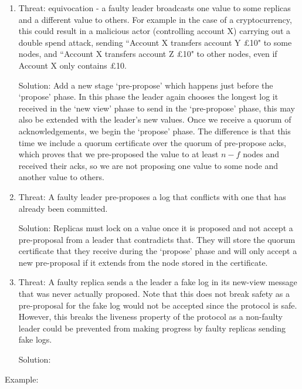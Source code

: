 \documentclass[a4paper]{article}
\begin{document}
\begin{enumerate}
\item Threat: equivocation - a faulty leader broadcasts one value to some replicas and a different value to others. For example in the case of a cryptocurrency, this could result in a malicious actor (controlling account X) carrying out a double spend attack, sending ``Account X transfers account Y £10" to some nodes, and ``Account X transfers account Z £10" to other nodes, even if Account X only contains £10.

Solution: Add a new stage `pre-propose' which happens just before the `propose' phase. In this phase the leader again chooses the longest log it received in the `new view' phase to send in the `pre-propose' phase, this may also be extended with the leader's new values. Once we receive a quorum of acknowledgements, we begin the `propose' phase. The difference is that this time we include a quorum certificate over the quorum of pre-propose acks, which proves that we pre-proposed the value to at least $n - f$ nodes and received their acks, so we are not proposing one value to some node and another value to others.

\item Threat: A faulty leader pre-proposes a log that conflicts with one that has already been committed.

Solution: Replicas must lock on a value once it is proposed and not accept a pre-proposal from a leader that contradicts that. They will store the quorum certificate that they receive during the `propose' phase and will only accept a new pre-proposal if it extends from the node stored in the certificate.

\item Threat: A faulty replica sends a the leader a fake log in its new-view message that was never actually proposed. Note that this does not break safety as a pre-proposal for the fake log would not be accepted since the protocol is safe. However, this breaks the liveness property of the protocol as a non-faulty leader could be prevented from making progress by faulty replicas sending fake logs.

Solution: 

\end{enumerate}

Example:
\end{document}
